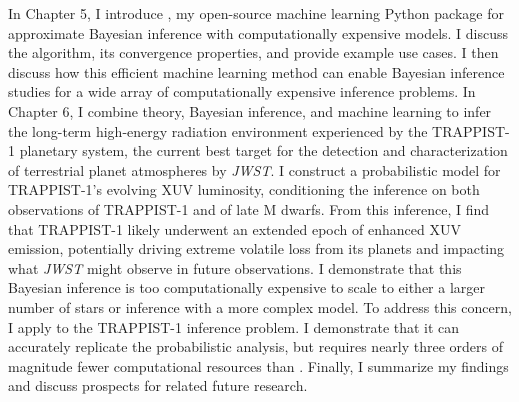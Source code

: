 In Chapter 5, I introduce \approxposterior, my open-source machine learning Python package for approximate Bayesian inference with computationally expensive models. I discuss the algorithm, its convergence properties, and provide example use cases. I then discuss how this efficient machine learning method can enable Bayesian inference studies for a wide array of computationally expensive inference problems. In Chapter 6, I combine theory, Bayesian inference, and machine learning to infer the long-term high-energy radiation environment experienced by the TRAPPIST-1 planetary system, the current best target for the detection and characterization of terrestrial planet atmospheres by \textit{JWST}. I construct a probabilistic model for TRAPPIST-1's evolving XUV luminosity, conditioning the inference on both observations of TRAPPIST-1 and of late M dwarfs. From this inference, I find that TRAPPIST-1 likely underwent an extended epoch of enhanced XUV emission, potentially driving extreme volatile loss from its planets and impacting what \textit{JWST} might observe in future observations. I demonstrate that this Bayesian inference is too computationally expensive to scale to either a larger number of stars or inference with a more complex model. To address this concern, I apply \approxposterior to the TRAPPIST-1 inference problem. I demonstrate that it can accurately replicate the probabilistic analysis, but requires nearly three orders of magnitude fewer computational resources than \emcee.  Finally, I summarize my findings and discuss prospects for related future research.

